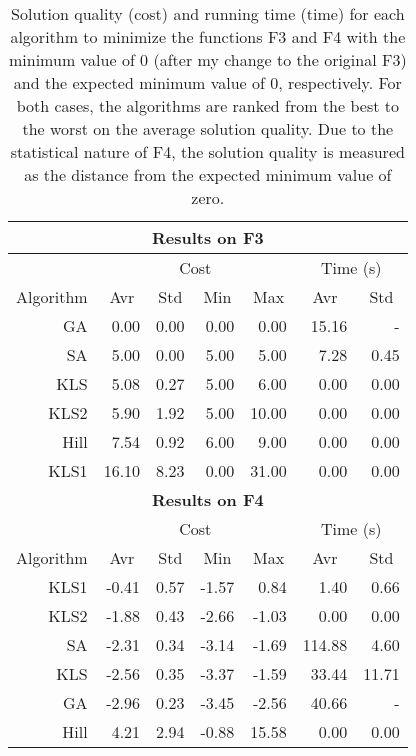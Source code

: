 \documentclass{article}
\begin{document}
\begin{table}[ht]
\centering
\begin{tabular}{r|rrrr|rr}
\hline
\multicolumn{7}{c}{{\bf Results on F3}}\\
\hline\hline
\multicolumn{1}{c}{} &
\multicolumn{4}{|c|}{Cost} &
\multicolumn{2}{c}{Time (s)}\\
\multicolumn{1}{c|}{Algorithm}
& \multicolumn{1}{c}{Avr}
& \multicolumn{1}{c}{Std}
& \multicolumn{1}{c}{Min}
& \multicolumn{1}{c}{Max}
& \multicolumn{1}{|c}{Avr}
& \multicolumn{1}{c}{Std} \\
\hline
GA   &  0.00 & 0.00 & 0.00 &  0.00 & 15.16 & -\\
SA   &  5.00 & 0.00 & 5.00 &  5.00 &  7.28 & 0.45\\
KLS  &  5.08 & 0.27 & 5.00 &  6.00 &  0.00 & 0.00\\
KLS2 &  5.90 & 1.92 & 5.00 & 10.00 &  0.00 & 0.00\\
Hill &  7.54 & 0.92 & 6.00 &  9.00 &  0.00 & 0.00\\
KLS1 & 16.10 & 8.23 & 0.00 & 31.00 &  0.00 & 0.00\\
\hline

\multicolumn{7}{c}{{\bf Results on F4}}\\
\hline\hline
\multicolumn{1}{c}{} &
\multicolumn{4}{|c|}{Cost} &
\multicolumn{2}{c}{Time (s)}\\
\multicolumn{1}{c|}{Algorithm}
& \multicolumn{1}{c}{Avr}
& \multicolumn{1}{c}{Std}
& \multicolumn{1}{c}{Min}
& \multicolumn{1}{c}{Max}
& \multicolumn{1}{|c}{Avr}
& \multicolumn{1}{c}{Std} \\
\hline
KLS1 & -0.41 & 0.57 & -1.57 &  0.84 &   1.40 &  0.66\\
KLS2 & -1.88 & 0.43 & -2.66 & -1.03 &   0.00 &  0.00\\
SA   & -2.31 & 0.34 & -3.14 & -1.69 & 114.88 &  4.60\\
KLS  & -2.56 & 0.35 & -3.37 & -1.59 &  33.44 & 11.71\\
GA   & -2.96 & 0.23 & -3.45 & -2.56 &  40.66 & -     \\
Hill &  4.21 & 2.94 & -0.88 & 15.58 &   0.00 &  0.00\\
\hline

\end{tabular}
\caption{Solution quality (cost) and running time (time) for each
  algorithm to minimize the functions F3 and F4 with the minimum value
  of $0$ (after my change to the original F3) and the expected minimum
  value of $0$, respectively. For both cases, the algorithms are
  ranked from the best to the worst on the average solution
  quality. Due to the statistical nature of F4, the solution quality
  is measured as the distance from the expected minimum value of
  zero.}
\label{tab:f3f4}
\end{table}
\end{document}

